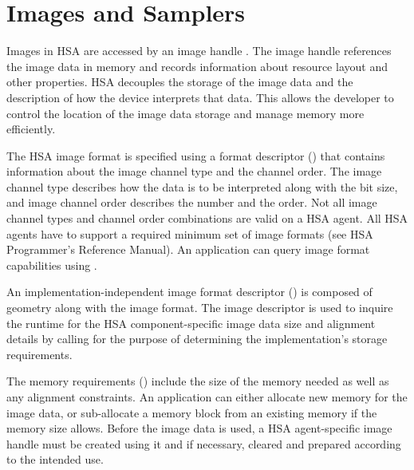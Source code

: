 \documentclass[final]{book}
\newcommand{\reffld}[1]{\textit{#1}}
\begin{document}



% 

\section{Images and Samplers}
\label{images} \hypertarget{images}{}

Images in HSA are accessed by an image handle . The
image handle references the image data in memory and records information about
resource layout and other properties. HSA decouples the storage of the image
data and the description of how the device interprets that data. This allows the
developer to control the location of the image data storage and manage memory
more efficiently.

The HSA image format is specified using a format descriptor
() that contains information about the image
channel type and the channel order. The image channel type describes how the
data is to be interpreted along with the bit size, and image channel order
describes the number and the order. Not all image channel types and channel
order combinations are valid on a HSA agent. All HSA agents have to support a
required minimum set of image formats (see HSA Programmer's Reference
Manual). An application can query image format capabilities using
.

An implementation-independent image format descriptor
() is composed of geometry along with the
image format. The image descriptor is used to inquire the runtime for the HSA
component-specific image data size and alignment details by calling
 for the purpose of determining the
implementation's storage requirements.

The memory requirements () include the size of the
memory needed as well as any alignment constraints. An application can either
allocate new memory for the image data, or sub-allocate a memory block from an
existing memory if the memory size allows. Before the image data is used, a HSA
agent-specific image handle must be created using it and if necessary, cleared
and prepared according to the intended use.
\end{document}
